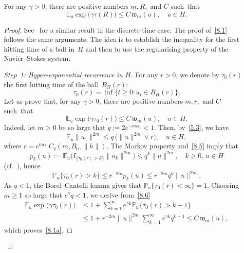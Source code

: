 \documentclass[10pt]{amsart}
\theoremstyle{definition}\newtheorem{defi}[theo]{Definition}\newtheorem{rema}[theo]{Remark}\newtheorem{exam}[theo]{Example}\newtheorem{exem}[theo]{Example}\newtheorem{nota}[theo]{Notation}
\newcommand{\IP}{{\mathbb P}}
\newcommand{\E}{{\mathbb E}}
\newcommand{\ty}{\infty}
\newcommand{\wwww}{{\mathfrak w}}
\newenvironment{step}{\begin{proof}}{\let\qed\relax \end{proof}}
\begin{document}
\begin{prop}\label{P:2.1}
For any $\gamma>0$, there are positive numbers $m,R,$ and $C$ such~that
\begin{equation}\label{8.1}
\E_u\exp\bigl(\gamma \tau(R)\bigr)\le C\,\wwww_m(u),
\quad u\in H.
\end{equation}
\end{prop}

\begin{proof}
See~\cite[Proposition~5.1]{JNPS-2014} for a similar result in the discrete-time case. The proof of~\eqref{8.1} follows the same arguments. The idea is to establish the inequality for the first hitting time of a ball in~$H$ and then to use the regularising property of the Navier--Stokes system.

\begin{step}[Step~1: Hyper-exponential recurrence in $H$]
For any $r>0$, we denote by $\tau_0(r)$ the first hitting time of the ball~$B_{H}(r)$:
\[
\tau_0(r)=\inf\{t\ge0:u_{t}\in B_{H}(r)\}.
\]
Let us prove that, for any $\gamma>0$, there are positive numbers $m,r,$ and $C$ such~that
\begin{equation}\label{8.1a}
\E_u\exp\bigl(\gamma \tau_{0}(r)\bigr)\le C\,\wwww_m(u),
\quad u\in H.
\end{equation}
Indeed, let $m>0$ be so large that $q:=2e^{-m\alpha_1 }<1$. Then, by~\eqref{5.3}, we have
\begin{equation}\label{8.5}
\E_u\|u_1\|^{2m}\le q\,\bigl(\|u\|^{2m}\vee r\bigr),\quad u\in H,
\end{equation}
where $r=e^{m\alpha_1 } C_4(m, B_0, \|h\|).$ The Markov property and~\eqref{8.5} imply that
\[
p_k(u):=\E_u\bigl(I_{\{\tau_0(r)>k\}}\|u_k\|^{2m}\bigr)\le q^k\|u\|^{2m},\quad k\ge0,\, u\in H
\]
(cf.~\cite[proof of Lemma~3.6.1]{KS-book}),
hence
\begin{equation}\label{8.6}
\IP_u\{\tau_0(r)>k\}\le r^{-2m}p_k(u)\le r^{-2m} q^k\|u\|^{2m}.
\end{equation}
As $q<1$, the Borel--Cantelli lemma gives that $\IP_u\{\tau_0(r)<\ty\}=1$. Choosing~$m\ge1$ so large that $e^{\gamma} q<1$, we derive from~\eqref{8.6}
\begin{align*}
\E_u\exp\bigl(\gamma \tau_0(r)\bigr)&\le1+\sum_{k=1}^\infty e^{\gamma k}\IP_u\{\tau_0(r)>k-1\}\\
&\le1+r^{-2m}\|u\|^{2m}\sum_{k=1}^\infty e^{\gamma k}q^{k-1}\le C\,\wwww_m(u),
\end{align*}
which proves~\eqref{8.1a}.
\end{step}


\end{proof}
\end{document}
